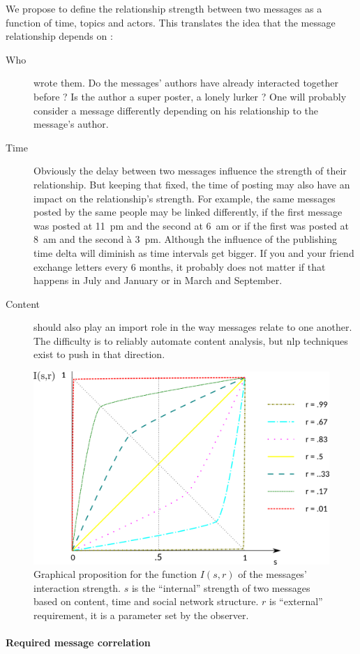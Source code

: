 \documentclass[a4paper,twoside]{article}
\begin{document}
We propose to define the relationship strength between two messages as a function of time, topics and actors.  This translates the idea that the message relationship depends on :
\begin{description}
\item[{Who}] wrote them.  Do the messages' authors have already interacted together before ?  Is the author a super poster, a lonely lurker ? One will probably consider a message differently depending on his relationship to the message's author.
\item[{Time}] Obviously the delay between two messages influence the strength of their relationship.  But keeping that fixed, the time of posting may also have an impact on the relationship's strength.  For example, the same messages posted by the same people may be linked differently, if the first message was posted at 11~pm and the second at 6~am or if the first was posted at 8~am and the second à 3~pm.  Although the influence of the publishing time delta will diminish as time intervals get bigger.  If you and your friend exchange letters every 6 months, it probably does not matter if that happens in July and January or in March and September.
\item[{Content}] should also play an import role in the way messages relate to one another.  The difficulty is to reliably automate content analysis, but \gls{nlp} techniques exist to push in that direction.
  
\end{description}
\begin{figure}[b]
  \centering
  \includegraphics[width=.5\textwidth]{images/func.png}
  \small{
    \caption{\label{fig:func} Graphical proposition for the function  $I(s,r)$ of the messages' interaction strength. $s$ is the ``internal'' strength of two messages based on content, time and social network structure.  $r$ is ``external'' requirement, it is a parameter set by the observer.
    }}
\end{figure}

\paragraph{Required message correlation}
\end{document}
